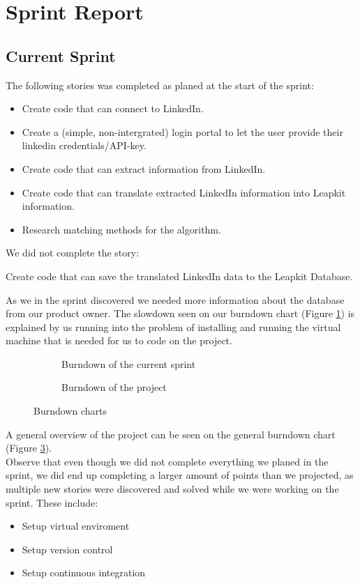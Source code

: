 \section{Sprint Report}

\subsection{Current Sprint}

The following stories was completed as planed at the start of the sprint:
\begin{itemize}
    \item Create code that can connect to LinkedIn.
    \item Create a (simple, non-intergrated) login portal to let the user provide their linkedin credentials/API-key. 
    \item Create code that can extract information from LinkedIn.
    \item Create code that can translate extracted LinkedIn information into Leapkit information.
    \item Research matching methods for the algorithm.
\end{itemize}
We did not complete the story:
\begin{center}
    Create code that can save the translated LinkedIn data to the Leapkit Database.
\end{center}
As we in the sprint discovered we needed more information about the database from our product owner. The slowdown seen on our burndown chart (Figure \ref{fig:burndownSprint}) is explained by us running into the problem of installing and running the virtual machine that is needed for us to code on the project.\\
\begin{figure}[!ht]
    \centering
    \begin{subfigure}[b]{0.5\textwidth}
        \scalebox{.6}{}
        \caption{Burndown of the current sprint}
        \label{fig:burndownSprint}
    \end{subfigure}%
    \begin{subfigure}[b]{0.5\textwidth}
        \scalebox{.7}{}
        \caption{Burndown of the project}
        \label{fig:burndownProject}
    \end{subfigure}
    \caption{Burndown charts}
\end{figure}
A general overview of the project can be seen on the general burndown chart (Figure \ref{fig:burndownProject}).\\
Observe that even though we did not complete everything we planed in the sprint, we did end up completing a larger amount of points than we projected, as multiple new stories were discovered and solved while we were working on the sprint. These include:
\begin{itemize}
    \item Setup virtual enviroment 
    \item Setup version control
    \item Setup continuous integration
\end{itemize}

